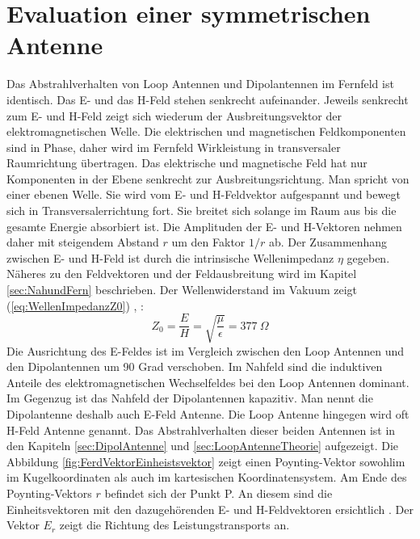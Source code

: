 
\newpage
\chapter{Evaluation einer symmetrischen Antenne}

Das Abstrahlverhalten von Loop Antennen und Dipolantennen im Fernfeld ist identisch. Das E- und das H-Feld stehen senkrecht aufeinander. Jeweils senkrecht zum E- und H-Feld zeigt sich wiederum der Ausbreitungsvektor der elektromagnetischen Welle. Die elektrischen und magnetischen Feldkomponenten sind in Phase, daher wird im Fernfeld Wirkleistung in transversaler Raumrichtung
übertragen. Das elektrische und magnetische Feld hat nur Komponenten in der Ebene senkrecht zur Ausbreitungsrichtung. Man spricht von einer ebenen Welle. Sie wird vom E- und H-Feldvektor aufgespannt und bewegt sich in
Transversalerrichtung fort. Sie breitet sich solange im Raum aus bis die gesamte Energie absorbiert ist. Die Amplituden der E- und H-Vektoren nehmen daher mit steigendem Abstand $r$ um den Faktor $1/r$ ab. Der Zusammenhang zwischen E- und H-Feld ist durch die intrinsische Wellenimpedanz $\eta$ gegeben. Näheres zu den Feldvektoren und der Feldausbreitung wird im Kapitel \ref{sec:NahundFern} beschrieben. Der Wellenwiderstand im Vakuum zeigt (\ref{eq:WellenImpedanzZ0}) \cite{Harrington-TimeHarmonic}, \cite{Emant}:
\begin{equation}\label{eq:WellenImpedanzZ0}
Z_{0}=\dfrac{E}{H}=\sqrt{\dfrac{\mu}{\epsilon}}=377\ \Omega
\end{equation}
Die Ausrichtung des E-Feldes ist im Vergleich zwischen den Loop Antennen und den Dipolantennen um 90 Grad verschoben. Im Nahfeld sind die induktiven Anteile des elektromagnetischen Wechselfeldes bei den Loop Antennen dominant. Im Gegenzug ist das Nahfeld der Dipolantennen kapazitiv. Man nennt die Dipolantenne deshalb auch E-Feld Antenne. Die Loop Antenne hingegen wird oft H-Feld Antenne genannt. Das Abstrahlverhalten dieser beiden Antennen ist in den Kapiteln \ref{sec:DipolAntenne} und \ref{sec:LoopAntenneTheorie} aufgezeigt. Die Abbildung \ref{fig:FerdVektorEinheistsvektor} zeigt einen Poynting-Vektor sowohlim im Kugelkoordinaten als auch im kartesischen Koordinatensystem. Am Ende des Poynting-Vektors $r$ befindet sich der Punkt P. An diesem sind die Einheitsvektoren mit den dazugehörenden E- und H-Feldvektoren ersichtlich \cite{Emant}. Der Vektor ${E}_r$ zeigt die Richtung des Leistungstransports an.\\



